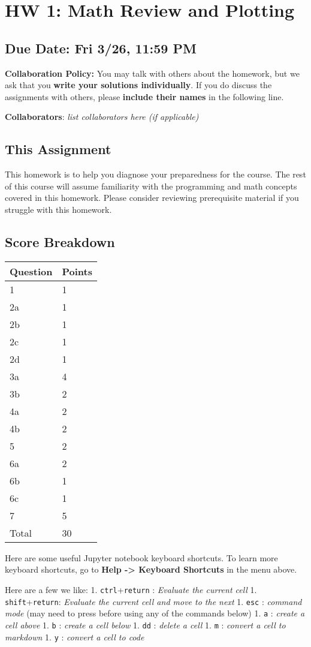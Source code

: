 \documentclass[11pt]{article}
\begin{document}
    \section{HW 1: Math Review and
Plotting}\label{hw-1-math-review-and-plotting}

\subsection{Due Date: Fri 3/26, 11:59
PM}\label{due-date-fri-326-1159-pm}

    \textbf{Collaboration Policy:} You may talk with others about the
homework, but we ask that you \textbf{write your solutions
individually}. If you do discuss the assignments with others, please
\textbf{include their names} in the following line.

\textbf{Collaborators}: \emph{list collaborators here (if applicable)}

    \subsection{This Assignment}\label{this-assignment}

This homework is to help you diagnose your preparedness for the course.
The rest of this course will assume familiarity with the programming and
math concepts covered in this homework. Please consider reviewing
prerequisite material if you struggle with this homework.

\subsection{Score Breakdown}\label{score-breakdown}

\begin{longtable}[]{@{}ll@{}}
\toprule
Question & Points\tabularnewline
\midrule
\endhead
1 & 1\tabularnewline
2a & 1\tabularnewline
2b & 1\tabularnewline
2c & 1\tabularnewline
2d & 1\tabularnewline
3a & 4\tabularnewline
3b & 2\tabularnewline
4a & 2\tabularnewline
4b & 2\tabularnewline
5 & 2\tabularnewline
6a & 2\tabularnewline
6b & 1\tabularnewline
6c & 1\tabularnewline
7 & 5\tabularnewline
Total & 30\tabularnewline
\bottomrule
\end{longtable}

    Here are some useful Jupyter notebook keyboard shortcuts. To learn more
keyboard shortcuts, go to \textbf{Help -\textgreater{} Keyboard
Shortcuts} in the menu above.

Here are a few we like: 1. \texttt{ctrl}+\texttt{return} :
\emph{Evaluate the current cell} 1. \texttt{shift}+\texttt{return}:
\emph{Evaluate the current cell and move to the next} 1. \texttt{esc} :
\emph{command mode} (may need to press before using any of the commands
below) 1. \texttt{a} : \emph{create a cell above} 1. \texttt{b} :
\emph{create a cell below} 1. \texttt{dd} : \emph{delete a cell} 1.
\texttt{m} : \emph{convert a cell to markdown} 1. \texttt{y} :
\emph{convert a cell to code}
\end{document}

